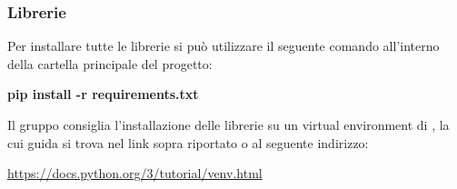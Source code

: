 \subsubsection{Librerie}
\label{sec:Librerie}
Per installare tutte le librerie si può utilizzare il seguente comando all'interno della cartella principale del progetto:\newline{}
\centerline{\textbf{pip install -r requirements.txt}}
Il gruppo consiglia l'installazione delle librerie su un virtual environment di , la cui guida si trova nel link sopra riportato o al seguente indirizzo:
\newline{}\centerline{\url{https://docs.python.org/3/tutorial/venv.html}}
